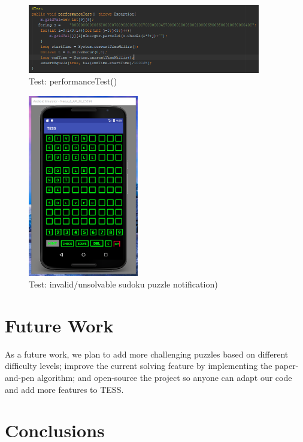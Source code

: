 \documentclass{article}
\begin{document}
\begin{figure}[ht]\centering
\includegraphics[width=4.0in]{./Figure/performance_test.PNG}
\caption{Test: performanceTest()}\label{fig:performanceTest}
\end{figure} 
\begin{figure}[ht]\centering
	\includegraphics[width=1.9in]{./Figure/Unsolvable_Puzzle.PNG}
	\caption{Test: invalid/unsolvable sudoku puzzle notification)}\label{fig:unsolvablePuzzleTest}
\end{figure} 

\section {Future Work}
As a future work, we plan to add more challenging puzzles based on different difficulty levels; improve the current solving feature by implementing the paper-and-pen algorithm; and open-source the project so anyone can adapt our code and add more features to TESS. 

\section{Conclusions} 
\end{document}
